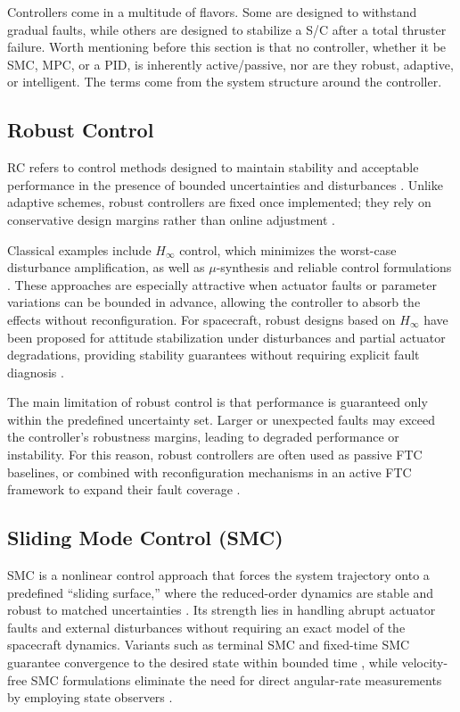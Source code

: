 Controllers come in a multitude of flavors. Some are designed to withstand gradual faults, while others are designed to stabilize a \gls{S/C} after a total thruster failure. Worth mentioning before this section is that no controller, whether it be \gls{SMC}, \gls{MPC}, or a PID, is inherently active/passive, nor are they robust, adaptive, or intelligent. The terms come from the system structure around the controller.

\subsection{Robust Control}

\gls{RC} refers to control methods designed to maintain stability and acceptable performance in the presence of bounded uncertainties and disturbances \cite{Zhang2008BibliographicalSystems,Jiang2012Fault-tolerantApproaches}. Unlike adaptive schemes, robust controllers are fixed once implemented; they rely on conservative design margins rather than online adjustment \cite{Jiang2012Fault-tolerantApproaches}.

Classical examples include $H_\infty$ control, which minimizes the worst-case disturbance amplification, as well as $\mu$-synthesis and reliable control formulations \cite{Yin2016ASystem}. These approaches are especially attractive when actuator faults or parameter variations can be bounded in advance, allowing the controller to absorb the effects without reconfiguration. For spacecraft, robust designs based on $H_\infty$ have been proposed for attitude stabilization under disturbances and partial actuator degradations, providing stability guarantees without requiring explicit fault diagnosis \cite{Yin2016ASystem}.

The main limitation of robust control is that performance is guaranteed only within the predefined uncertainty set. Larger or unexpected faults may exceed the controller’s robustness margins, leading to degraded performance or instability. For this reason, robust controllers are often used as passive FTC baselines, or combined with reconfiguration mechanisms in an active FTC framework to expand their fault coverage \cite{Zhang2008BibliographicalSystems,Jiang2012Fault-tolerantApproaches}.

\subsection{Sliding Mode Control (SMC)}
  \gls{SMC} is a nonlinear control approach that forces the system trajectory onto a predefined “sliding surface,” where the reduced-order dynamics are stable and robust to matched uncertainties \cite{Yin2016ASystem,Mirshams2014PassiveThrusters}. Its strength lies in handling abrupt actuator faults and external disturbances without requiring an exact model of the spacecraft dynamics. Variants such as terminal SMC and fixed-time SMC guarantee convergence to the desired state within bounded time \cite{Cao2013FaultMode}, while velocity-free SMC formulations eliminate the need for direct angular-rate measurements by employing state observers \cite{Guo2019Velocity-freeSaturation}
.

